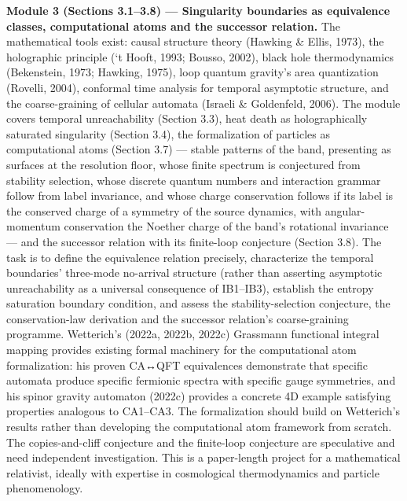 \documentclass[
]{article}
\begin{document}
\textbf{Module 3 (Sections 3.1--3.8) --- Singularity boundaries as
equivalence classes, computational atoms and the successor relation.}
The mathematical tools exist: causal structure theory (Hawking \& Ellis,
1973), the holographic principle (`t Hooft, 1993; Bousso, 2002), black
hole thermodynamics (Bekenstein, 1973; Hawking, 1975), loop quantum
gravity's area quantization (Rovelli, 2004), conformal time analysis for
temporal asymptotic structure, and the coarse-graining of cellular
automata (Israeli \& Goldenfeld, 2006). The module covers temporal
unreachability (Section 3.3), heat death as holographically saturated
singularity (Section 3.4), the formalization of particles as
computational atoms (Section 3.7) --- stable patterns of the band,
presenting as surfaces at the resolution floor, whose finite spectrum is
conjectured from stability selection, whose discrete quantum numbers and
interaction grammar follow from label invariance, and whose charge
conservation follows if its label is the conserved charge of a symmetry
of the source dynamics, with angular-momentum conservation the Noether
charge of the band's rotational invariance --- and the successor
relation with its finite-loop conjecture (Section 3.8). The task is to
define the equivalence relation precisely, characterize the temporal
boundaries' three-mode no-arrival structure (rather than asserting
asymptotic unreachability as a universal consequence of IB1--IB3),
establish the entropy saturation boundary condition, and assess the
stability-selection conjecture, the conservation-law derivation and the
successor relation's coarse-graining programme. Wetterich's (2022a,
2022b, 2022c) Grassmann functional integral mapping provides existing
formal machinery for the computational atom formalization: his proven
CA↔QFT equivalences demonstrate that specific automata produce specific
fermionic spectra with specific gauge symmetries, and his spinor gravity
automaton (2022c) provides a concrete 4D example satisfying properties
analogous to CA1--CA3. The formalization should build on Wetterich's
results rather than developing the computational atom framework from
scratch. The copies-and-cliff conjecture and the finite-loop conjecture
are speculative and need independent investigation. This is a
paper-length project for a mathematical relativist, ideally with
expertise in cosmological thermodynamics and particle phenomenology.
\end{document}
